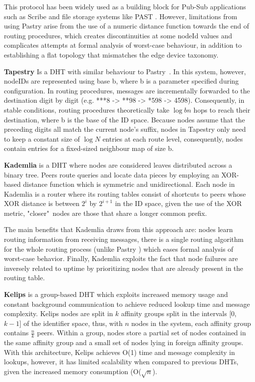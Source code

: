 This protocol has been widely used as a building block for Pub-Sub applications such as Scribe \cite{10.1007/3-540-45546-9_3} and file storage systems like PAST \cite{990064}. However, limitations from using Pastry arise from the use of a numeric distance function towards the end of routing procedures, which creates discontinuities at some nodeId values and complicates attempts at formal analysis of worst-case behaviour, in addition to establishing a flat topology that mismatches the edge device taxonomy.

\textbf{Tapestry} \cite{tapestry} Is a DHT with similar behaviour to Pastry~\cite{rowstron2001pastry}. In this system, however, nodeIDs are represented using base b, where b is a parameter specified during configuration. In routing procedures, messages are incrementally forwarded to the destination digit by digit (e.g. ***8 -> **98 -> *598 -> 4598). Consequently, in stable conditions, routing procedures theoretically take $\log{b}{n}$ hops to reach their destination, where b is the base of the ID space. Because nodes assume that the preceding digits all match the current node's suffix, nodes in Tapestry only need to keep a constant size of $\log{N}$ entries at each route level, consequently, nodes contain entries for a fixed-sized neighbour map of size b.  

\textbf{Kademlia} \cite{maymounkov2002kademlia} is a DHT where nodes are considered leaves distributed across a binary tree. Peers route queries and locate data pieces by employing an XOR-based distance function which is symmetric and unidirectional. Each node in Kademlia is a router where its routing tables consist of shortcuts to peers whose XOR distance is between \(2^{i}\) by \(2^{i + 1}\) in the ID space, given the use of the XOR metric, "closer"\ nodes are those that share a longer common prefix.

The main benefits that Kademlia draws from this approach are: nodes learn routing information from receiving messages, there is a single routing algorithm for the whole routing process (unlike Pastry \cite{rowstron2001pastry}) which eases formal analysis of worst-case behavior. Finally, Kademlia exploits the fact that node failures are inversely related to uptime by prioritizing nodes that are already present in the routing table.

\textbf{Kelips} \cite{gupta2003kelips} is a group-based DHT which exploits increased memory usage and constant background communication to achieve reduced lookup time and message complexity. Kelips nodes are split in $k$ affinity groups split in the intervals [0,$k-1$] of the identifier space, thus, with $n$ nodes in the system, each affinity group contains $\frac{n}{k}$ peers. Within a group, nodes store a partial set of nodes contained in the same affinity group and a small set of nodes lying in foreign affinity groups. With this architecture, Kelips achieves O(1) time and message complexity in lookups, however, it has limited scalability when compared to previous DHTs, given the increased memory consumption (O($\sqrt{n}$).

